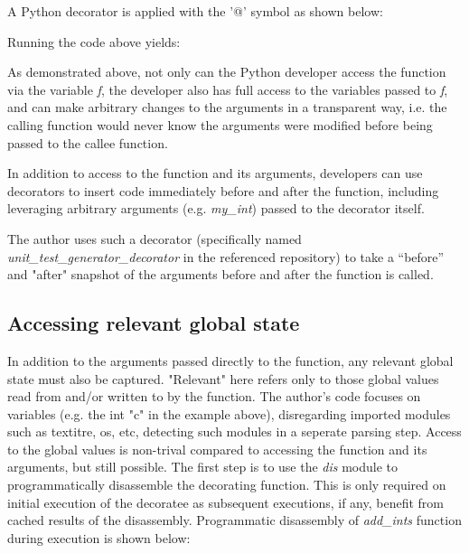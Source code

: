 A Python decorator is applied with the '@' symbol as shown below:



Running the code above yields:



As demonstrated above, not only can the Python developer access the function
via the variable \textit{f}, the developer also has full
access to the variables passed to \textit{f}, and can make 
arbitrary changes to the arguments in a transparent way, 
i.e. the calling function would never know the arguments 
were modified before being passed to the callee function.

In addition to access to the function and its arguments,
developers can use decorators to insert code immediately before and after 
the function, including leveraging arbitrary arguments (e.g.
\textit{my\_int}) passed to the decorator itself.

The author uses such a decorator (specifically named 
\break
\textit{unit\_test\_generator\_decorator} in the referenced repository) to take
 a “before” and "after" snapshot of the arguments
before and after the function is called.

%
\subsection{Accessing relevant global state}\label{sec:approach-internal-2}

In addition to the arguments passed directly to the function, any relevant 
global state must also be captured. "Relevant" here refers only to those 
global values read from and/or written to by the function.
The author's code focuses on variables (e.g. the int "c" in the example above), 
disregarding imported modules such as textit{re, os, etc}, detecting such
modules in a seperate parsing step.
Access to the global values is non-trival compared to accessing the function 
and its arguments, but still possible.  The first step is to use the \textit{dis}
module to programmatically disassemble the decorating function.  This is only 
required on initial execution of the decoratee as subsequent executions, if any, 
benefit from cached results of the disassembly.
Programmatic disassembly of \textit{add\_ints} function during execution is shown below:

